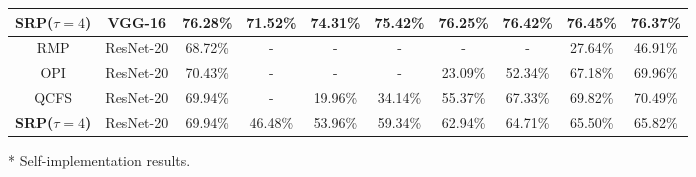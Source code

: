 \documentclass[letterpaper]{article} %
\begin{document}
\begin{table}[t]
\begin{threeparttable}
\begin{tabular}{cccccccccc}
	\textbf{SRP($\tau=4$)} & VGG-16 & 76.28\% & 71.52\% & 74.31\% & 75.42\% & 76.25\% & 76.42\% & 76.45\% & 76.37\% \\ \hline
	RMP                    & ResNet-20 & 68.72\% & - & - & - & - & - & 27.64\% & 46.91\% \\ \hline
	OPI                    & ResNet-20 & 70.43\% & - & - & - & 23.09\% & 52.34\% & 67.18\% & 69.96\%  \\\hline
	QCFS                   & ResNet-20 & 69.94\% & - & 19.96\% & 34.14\% & 55.37\% & 67.33\% & 69.82\% & 70.49\% \\\hline
	\textbf{SRP($\tau=4$)} & ResNet-20 & 69.94\% & 46.48\% & 53.96\% & 59.34\% & 62.94\% & 64.71\% & 65.50\% & 65.82\% \\ \hline
	\end{tabular}
        \begin{tablenotes}
        \footnotesize
        \item[*] Self-implementation results.
        \end{tablenotes}
        \end{threeparttable}
	\label{table02}
\end{table}
\end{document}
